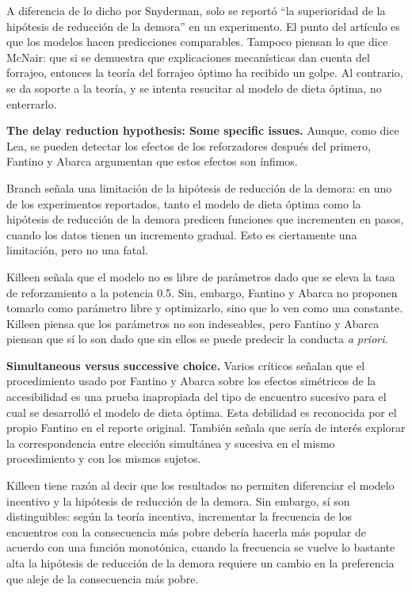 \documentclass[a4paper,12pt]{article}
\begin{document}
A diferencia de lo dicho por Snyderman, solo se reportó ``la superioridad de la hipótesis de reducción de la demora'' en un experimento. El punto del artículo es que los modelos hacen predicciones comparables. Tampoco piensan lo que dice McNair: que si se demuestra que explicaciones mecanísticas dan cuenta del forrajeo, entonces la teoría del forrajeo óptimo ha recibido un golpe. Al contrario, se da soporte a la teoría, y se intenta resucitar al modelo de dieta óptima, no enterrarlo. 

{\bfseries The delay reduction hypothesis: Some specific issues.} Aunque, como dice Lea, se pueden detectar los efectos de los reforzadores después del primero, Fantino y Abarca argumentan que estos efectos son ínfimos.

Branch señala una limitación de la hipótesis de reducción de la demora: en uno de los experimentos reportados, tanto el modelo de dieta óptima como la hipótesis de reducción de la demora predicen funciones que incrementen en pasos, cuando los datos tienen un incremento gradual. Esto es ciertamente una limitación, pero no una fatal.

Killeen señala que el modelo no es libre de parámetros dado que se eleva la tasa de reforzamiento a la potencia 0.5. Sin, embargo, Fantino y Abarca no proponen tomarlo como parámetro libre y optimizarlo, sino que lo ven como una constante. Killeen piensa que los parámetros no son indeseables, pero Fantino y Abarca piensan que sí lo son dado que sin ellos se puede predecir la conducta {\itshape a priori}. 

{\bfseries Simultaneous versus successive choice.} Varios críticos señalan que el procedimiento usado por Fantino y Abarca sobre los efectos simétricos de la accesibilidad es una prueba inapropiada del tipo de encuentro sucesivo para el cual se desarrolló el modelo de dieta óptima. Esta debilidad es reconocida por el propio Fantino en el reporte original. También señala que sería de interés explorar la correspondencia entre elección simultánea y sucesiva en el mismo procedimiento y con los mismos sujetos. 

Killeen tiene razón al decir que los resultados no permiten diferenciar el modelo incentivo y la hipótesis de reducción de la demora. Sin embargo, sí son distinguibles: según la teoría incentiva, incrementar la frecuencia de los encuentros con la consecuencia más pobre debería hacerla más popular de acuerdo con una función monotónica, cuando la frecuencia se vuelve lo bastante alta la hipótesis de reducción de la demora requiere un cambio en la preferencia que aleje de la consecuencia más pobre. 
\end{document}
